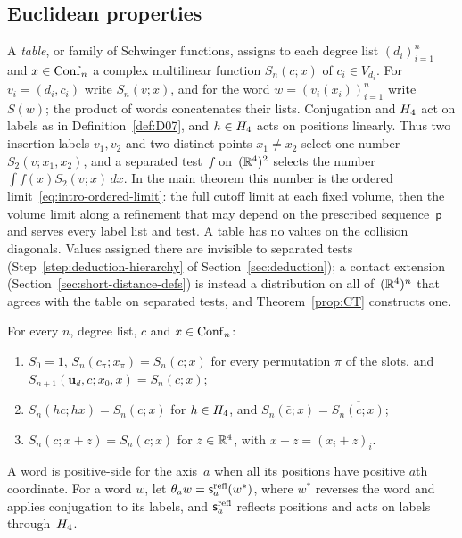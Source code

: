 \subsection{Euclidean properties}\label{sec:euclidean-properties}

A \emph{table}, or family of Schwinger functions, assigns to each degree list $(d_i)_{i=1}^n$ and $x\in\mathrm{Conf}_{n}$ a complex multilinear function $S_n(c;x)$ of $c_i\in V_{d_i}$. For $v_i=(d_i,c_i)$ write $S_n(v;x)$, and for the word $w=(v_i(x_i))_{i=1}^n$ write $S(w)$; the product of words concatenates their lists. Conjugation and $H_4$ act on labels as in Definition~\ref{def:D07}, and $h\in H_4$ acts on positions linearly. Thus two insertion labels $v_1,v_2$ and two distinct points $x_1\ne x_2$ select one number $S_2(v;x_1,x_2)$, and a separated test~$f$ on~$(\mathbb{R}^4)^2$ selects the number $\int f(x)S_2(v;x)\,dx$. In the main theorem this number is the ordered limit~\eqref{eq:intro-ordered-limit}: the full cutoff limit at each fixed volume, then the volume limit along a refinement that may depend on the prescribed sequence~$\mathsf p$ and serves every label list and test. A table has no values on the collision diagonals. Values assigned there are invisible to separated tests (Step~\ref{step:deduction-hierarchy} of Section~\ref{sec:deduction}); a contact extension (Section~\ref{sec:short-distance-defs}) is instead a distribution on all of~$(\mathbb{R}^4)^n$ that agrees with the table on separated tests, and Theorem~\ref{prop:CT} constructs one.

\begin{definition}\label{def:E1-E3}
For every $n$, degree list, $c$ and $x\in\mathrm{Conf}_{n}$:
\begin{enumerate}[label=\textup{(E\arabic*)},ref=E\arabic*,nosep]
\item\label{it:E1} $S_0=1$, $S_n(c_\pi;x_\pi)=S_n(c;x)$ for every permutation $\pi$ of the slots, and $S_{n+1}(\mathbf u_d,c;x_0,x)=S_n(c;x)$;
\item\label{it:E2} $S_n(hc;hx)=S_n(c;x)$ for $h\in H_4$, and $S_n(\bar c;x)=\overline{S_n(c;x)}$;
\item\label{it:E3} $S_n(c;x+z)=S_n(c;x)$ for $z\in\mathbb{R}^4$, with $x+z=(x_i+z)_i$.
\end{enumerate}
\end{definition}

A word is positive-side for the axis~$a$ when all its positions have positive $a$th coordinate. For a word $w$, let $\theta_aw=\mathsf s_a^{\rm refl}(w^*)$, where $w^*$ reverses the word and applies conjugation to its labels, and $\mathsf s_a^{\rm refl}$ reflects positions and acts on labels through~$H_4$.

